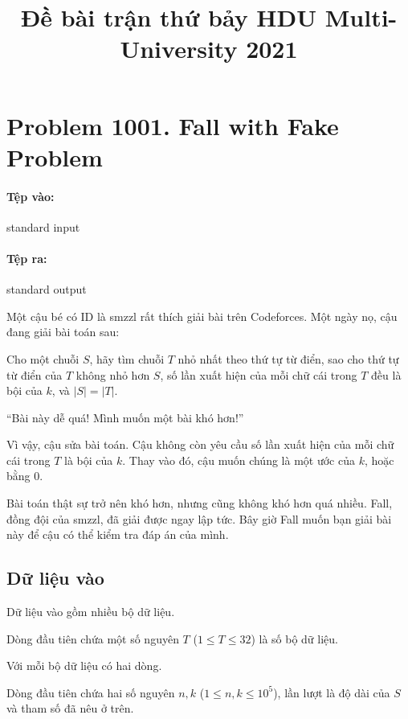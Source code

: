 \documentclass[11pt]{article}
\title{Đề bài trận thứ bảy HDU Multi-University 2021}
\author{}
\date{}
\begin{document}
\maketitle


\section{Problem 1001. Fall with Fake Problem}

\paragraph{Tệp vào:} standard input
\paragraph{Tệp ra:} standard output

Một cậu bé có ID là smzzl rất thích giải bài trên Codeforces. Một ngày nọ,
cậu đang giải bài toán sau:

Cho một chuỗi \(S\), hãy tìm chuỗi \(T\) nhỏ nhất theo thứ tự từ điển, sao cho
thứ tự từ điển của \(T\) không nhỏ hơn \(S\), số lần xuất hiện của mỗi chữ cái
trong \(T\) đều là bội của \(k\), và \(|S|=|T|\).

``Bài này dễ quá! Mình muốn một bài khó hơn!''

Vì vậy, cậu sửa bài toán. Cậu không còn yêu cầu số lần xuất hiện của mỗi chữ
cái trong \(T\) là bội của \(k\). Thay vào đó, cậu muốn chúng là một ước của
\(k\), hoặc bằng \(0\).

Bài toán thật sự trở nên khó hơn, nhưng cũng không khó hơn quá nhiều. Fall,
đồng đội của smzzl, đã giải được ngay lập tức. Bây giờ Fall muốn bạn giải bài
này để cậu có thể kiểm tra đáp án của mình.

\subsection*{Dữ liệu vào}

Dữ liệu vào gồm nhiều bộ dữ liệu.

Dòng đầu tiên chứa một số nguyên \(T\) (\(1\le T\le 32\)) là số bộ dữ liệu.

Với mỗi bộ dữ liệu có hai dòng.

Dòng đầu tiên chứa hai số nguyên \(n,k\) (\(1\le n,k\le 10^5\)), lần lượt là
độ dài của \(S\) và tham số đã nêu ở trên.
\end{document}

